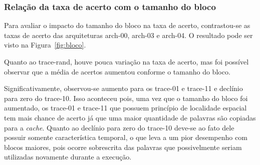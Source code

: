 \subsubsection{Relação da taxa de acerto com o tamanho do bloco}

Para avaliar o impacto do tamanho do bloco na taxa de acerto, contrastou-se as taxas de acerto das arquiteturas arch-00, arch-03 e arch-04. O resultado pode ser visto na Figura~\ref{fig:bloco}.

Quanto ao trace-rand, houve pouca variação na taxa de acerto, mas foi possível observar que a média de acertos aumentou conforme o tamanho do bloco.

Significativamente, observou-se aumento para os trace-01 e trace-11 e declínio para zero do trace-10. Isso aconteceu pois, uma vez que o tamanho do bloco foi aumentado, os trace-01 e trace-11 que possuem princípio de localidade espacial tem mais chance de acerto já que uma maior quantidade de palavras são copiadas para a \textit{cache}. Quanto ao declínio para zero do trace-10 deve-se ao fato dele possuir somente característica temporal, o que leva a um pior desempenho com blocos maiores, pois ocorre sobrescrita das palavras que possivelmente seriam utilizadas novamente durante a execução.

